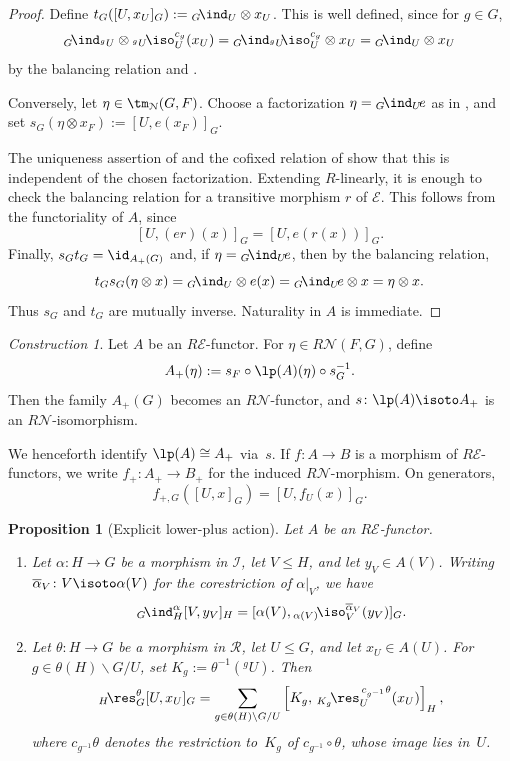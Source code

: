 \documentclass{amsart}
\numberwithin{equation}{section}%
\newtheorem{Prop}[equation]{Proposition}
\theoremstyle{remark}
\newtheorem{Cons}[equation]{Construction}
\theoremstyle{definition}
\newcommand{\e}{\mathcal E}
\newcommand{\n}{\mathcal N}
\newcommand{\lind}[1]{{}_{#1}\!\ind}
\newcommand{\lres}[1]{{}_{#1}\!\res}
\newcommand{\liso}[1]{{}_{#1}\!\iso}
\newcommand{\ol}[1]{\overline{#1}}
\begin{document}
\begin{proof}
Define $t_G([U,x_U]_G):={}\lind{G}_U\otimes x_U$.
This is well defined, since for $g\in G$,
%
\[
{}\lind{G}_{{}^gU}\otimes
{}\liso{{}^gU}_U^{c_g}(x_U)
={}\lind{G}_{{}^gU}{}\!\liso{}_U^{c_g}\otimes x_U=
{}\lind{G}_U\otimes x_U
\]
%
by the balancing relation and
.

Conversely, let
$\eta\in\tm_{\mathcal N}(G,F)$.
Choose a factorization
$\eta={}\lind{G}_U\!e$
as in , and set
$s_G(\eta\otimes x_F):=[U,e(x_F)]_G$.

The uniqueness assertion of
 and the cofixed relation of
 show that this is independent of
the chosen factorization. Extending $R$-linearly, it is enough to check the balancing
relation for a transitive morphism $r$ of $\mathcal E$. This follows from
the functoriality of $A$, since
%
\[
[U,(er)(x)]_G=[U,e(r(x))]_G.
\]
%
Finally,
$s_Gt_G=\id_{A_+(G)}$ and, if $\eta={}\lind{G}_U\!e$, then by the
balancing relation,
%
\[
t_Gs_G(\eta\otimes x)
=
{}\lind{G}_U\otimes e(x)
={}\lind{G}_U\!e\otimes x=
\eta\otimes x.
\]
%
Thus $s_G$ and $t_G$ are mutually inverse. Naturality in $A$ is immediate.
\end{proof}
%
\begin{Cons}
\label{con:lower-plus-action}
Let $A$ be an $R\e$-functor. For
$\eta\in R\n(F,G)$, define
%
\[
A_+(\eta)
:=
s_F\circ \lp(A)(\eta)\circ s_G^{-1}.
\]
%
Then the family $A_+(G)$ becomes an $R\n$-functor, and
$s\colon \lp(A)\isoto A_+$ is an $R\n$-isomorphism.

We henceforth identify $\lp(A)\cong A_+$ via~$s$.
If $f\colon A\to B$ is a morphism of $R\e$-functors, we write
$f_+\colon A_+\to B_+$ for the induced $R\n$-morphism. On generators,
%
\[
f_{+,G}([U,x]_G)=[U,f_U(x)]_G.
\]
%
\end{Cons}
%
\begin{Prop}[Explicit lower-plus action]
\label{prop:lower-plus-action}
Let $A$ be an $R\e$-functor.
\begin{enumerate}
\item[(a)]
Let $\alpha\colon H\to G$ be a morphism in $\mathcal I$,
let $V\leq H$, and let $y_V\in A(V)$.
Writing
$\ol{\alpha}_V\colon V\isoto\alpha(V)$
for the corestriction of $\alpha|_V$, we have
%
\[
\lind{G}_H^\alpha[V,y_V]_H
=
[\alpha(V),
{}\liso{\alpha(V)}_V^{\ol{\alpha}_V}(y_V)]_G.
\]

\item[(b)]
Let $\theta\colon H\to G$ be a morphism in $\mathcal R$,
let $U\leq G$, and let $x_U\in A(U)$.
For
$g\in\theta(H)\backslash G/U$, set
$K_g:=\theta^{-1}({}^gU)$.
Then
%
\[
\lres{H}_G^\theta[U,x_U]_G
=
\sum_{g\in\theta(H)\backslash G/U}
\left[
K_g,\,
{}\lres{K_g}_U^{\,c_{g^{-1}}\theta}(x_U)
\right]_H,
\]
%
where $c_{g^{-1}}\theta$ denotes the restriction to~$K_g$
of $c_{g^{-1}}\circ\theta$, whose image lies in~$U$.
\end{enumerate}
\end{Prop}
\end{document}

